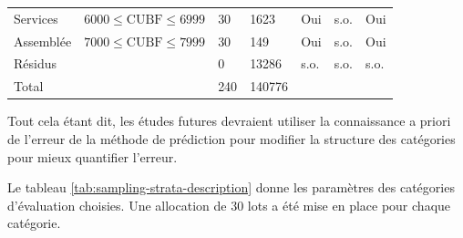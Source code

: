 \begin{table}[ht]
\begin{tabular}{m{4.5cm}                m{4.25cm}                          m{0.75cm}                     m{0.75cm}m{1cm} m{1cm}  m{1cm}}
                \quad Services                      & $6000 \leq \text{CUBF} \leq 6999$    & 30                                    & 1623                      & Oui   & s.o.       & Oui \\
                \quad Assemblée                     & $7000 \leq \text{CUBF} \leq 7999 $   & 30                                    & 149                       & Oui   & s.o.       & Oui \\ 
                Résidus                             &                               & 0                                     & 13286                     & s.o.   & s.o.       & s.o.\\ 
                \hline
                Total                           &                                    & 240                                  & 140776                    &       &           & \\
            \end{tabular}
        \end{table}
        Tout cela étant dit, les études futures devraient utiliser la connaissance a priori de l'erreur de la méthode de prédiction pour modifier la structure des catégories pour mieux quantifier l'erreur.\par
        
        
        Le tableau \ref{tab:sampling-strata-description} donne les paramètres des catégories d'évaluation choisies. Une allocation de 30 lots a été mise en place pour chaque catégorie. 
        

    
